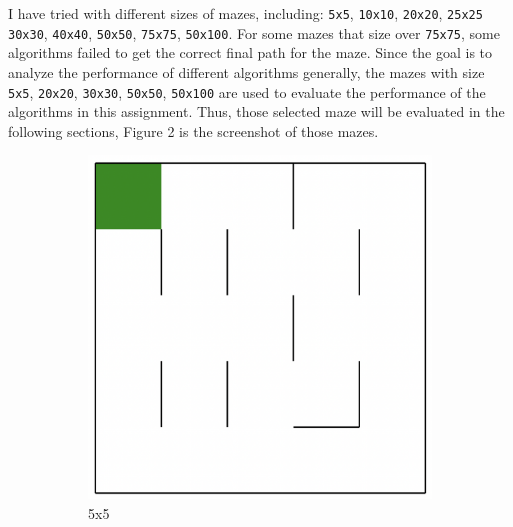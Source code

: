 \documentclass{article}
\begin{document}
I have tried with different sizes of mazes, including: \texttt{5x5}, \texttt{10x10}, \texttt{20x20}, \texttt{25x25} \texttt{30x30}, \texttt{40x40}, \texttt{50x50}, \texttt{75x75}, \texttt{50x100}.
For some mazes that size over \texttt{75x75}, some algorithms failed to get the correct final path for the maze. 
Since the goal is to analyze the performance of different algorithms generally, the mazes with size \texttt{5x5}, \texttt{20x20}, \texttt{30x30}, \texttt{50x50}, \texttt{50x100} are used to evaluate the performance of the algorithms in this assignment.
Thus, those selected maze will be evaluated in the following sections, Figure 2 is the screenshot of those mazes.
\begin{figure}[h]
    \centering
    \begin{subfigure}[b]{0.3\textwidth}
        \centering
        \includegraphics[width=\textwidth]{imgs/5x5.eps}
        \caption{5x5}
    \end{subfigure}
    \begin{subfigure}[b]{0.3\textwidth}
        \centering

\end{subfigure}
\end{figure}
\end{document}

